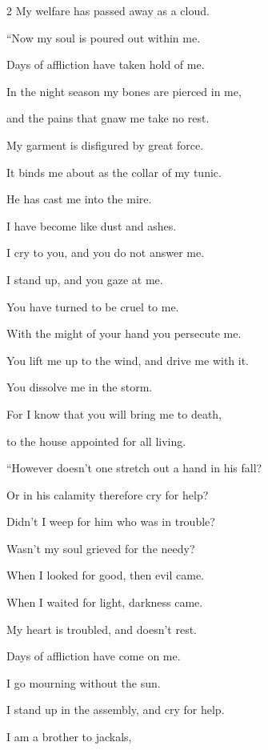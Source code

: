 \begin{multicols}{2}
	My welfare has passed away as a cloud.
	
		\vspace{\baselineskip}
	
	\myverse{}“Now my soul is poured out within me.
	
	Days of affliction have taken hold of me.
	
	\myverse{}In the night season my bones are pierced in me,
	
	and the pains that gnaw me take no rest.
	
	\myverse{}My garment is disfigured by great force.
	
	It binds me about as the collar of my tunic.
	
	\myverse{}He has cast me into the mire.
	
	I have become like dust and ashes.
	
	\myverse{}I cry to you, and you do not answer me.
	
	I stand up, and you gaze at me.
	
	\myverse{}You have turned to be cruel to me.
	
	With the might of your hand you persecute me.
	
	\myverse{}You lift me up to the wind, and drive me with it.
	
	You dissolve me in the storm.
	
	\myverse{}For I know that you will bring me to death,
	
	to the house appointed for all living.
	
		\vspace{\baselineskip}
	
	
	\myverse{}“However doesn’t one stretch out a hand in his fall?
	
	Or in his calamity therefore cry for help?
	
	\myverse{}Didn’t I weep for him who was in trouble?
	
	Wasn’t my soul grieved for the needy?
	
	\myverse{}When I looked for good, then evil came.
	
	When I waited for light, darkness came.
	
	\myverse{}My heart is troubled, and doesn’t rest.
	
	Days of affliction have come on me.
	
	\myverse{}I go mourning without the sun.
	
	I stand up in the assembly, and cry for help.
	
	\myverse{}I am a brother to jackals,
	

\end{multicols}
